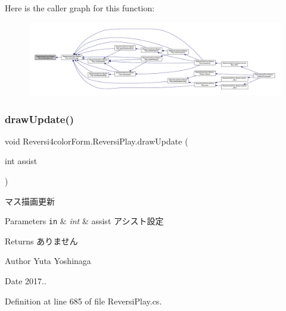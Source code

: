 Here is the caller graph for this function\+:\nopagebreak
\begin{figure}[H]
\begin{center}
\leavevmode
\includegraphics[width=350pt]{class_reversi4color_form_1_1_reversi_play_aad21cdb2b475bc1d65ab32bca755f24f_icgraph}
\end{center}
\end{figure}
\mbox{\label{class_reversi4color_form_1_1_reversi_play_a61428c9797c95359b397564d0bcfa7e7}} 
\subsubsection{\texorpdfstring{draw\+Update()}{drawUpdate()}}
{\footnotesize\ttfamily void Reversi4color\+Form.\+Reversi\+Play.\+draw\+Update (\begin{DoxyParamCaption}\item[{int}]{assist }\end{DoxyParamCaption})}



マス描画更新 


\begin{DoxyParams}[1]{Parameters}
\mbox{\tt in}  & {\em int} & assist アシスト設定 \\
\hline
\end{DoxyParams}
\begin{DoxyReturn}{Returns}
ありません 
\end{DoxyReturn}
\begin{DoxyAuthor}{Author}
Yuta Yoshinaga 
\end{DoxyAuthor}
\begin{DoxyDate}{Date}
2017.. 
\end{DoxyDate}


Definition at line 685 of file Reversi\+Play.\+cs.



